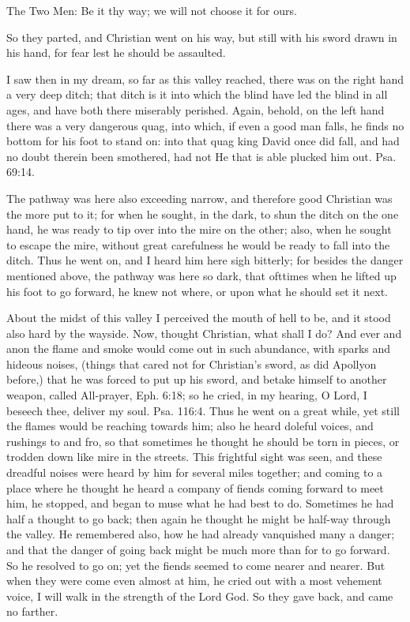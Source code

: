 The Two Men: Be it thy way; we will not choose it for ours.

So they parted, and Christian went on his way, but still with his sword drawn in his hand, for fear lest he should be assaulted.

I saw then in my dream, so far as this valley reached, there was on the right hand a very deep ditch; that ditch is it into which the blind have led the blind in all ages, and have both there miserably perished. Again, behold, on the left hand there was a very dangerous quag, into which, if even a good man falls, he finds no bottom for his foot to stand on: into that quag king David once did fall, and had no doubt therein been smothered, had not He that is able plucked him out. Psa. 69:14.

The pathway was here also exceeding narrow, and therefore good Christian was the more put to it; for when he sought, in the dark, to shun the ditch on the one hand, he was ready to tip over into the mire on the other; also, when he sought to escape the mire, without great carefulness he would be ready to fall into the ditch. Thus he went on, and I heard him here sigh bitterly; for besides the danger mentioned above, the pathway was here so dark, that ofttimes when he lifted up his foot to go forward, he knew not where, or upon what he should set it next.

About the midst of this valley I perceived the mouth of hell to be, and it stood also hard by the wayside. Now, thought Christian, what shall I do? And ever and anon the flame and smoke would come out in such abundance, with sparks and hideous noises, (things that cared not for Christian's sword, as did Apollyon before,) that he was forced to put up his sword, and betake himself to another weapon, called All-prayer, Eph. 6:18; so he cried, in my hearing, O Lord, I beseech thee, deliver my soul. Psa. 116:4. Thus he went on a great while, yet still the flames would be reaching towards him; also he heard doleful voices, and rushings to and fro, so that sometimes he thought he should be torn in pieces, or trodden down like mire in the streets. This frightful sight was seen, and these dreadful noises were heard by him for several miles together; and coming to a place where he thought he heard a company of fiends coming forward to meet him, he stopped, and began to muse what he had best to do. Sometimes he had half a thought to go back; then again he thought he might be half-way through the valley. He remembered also, how he had already vanquished many a danger; and that the danger of going back might be much more than for to go forward. So he resolved to go on; yet the fiends seemed to come nearer and nearer. But when they were come even almost at him, he cried out with a most vehement voice, I will walk in the strength of the Lord God. So they gave back, and came no farther.

